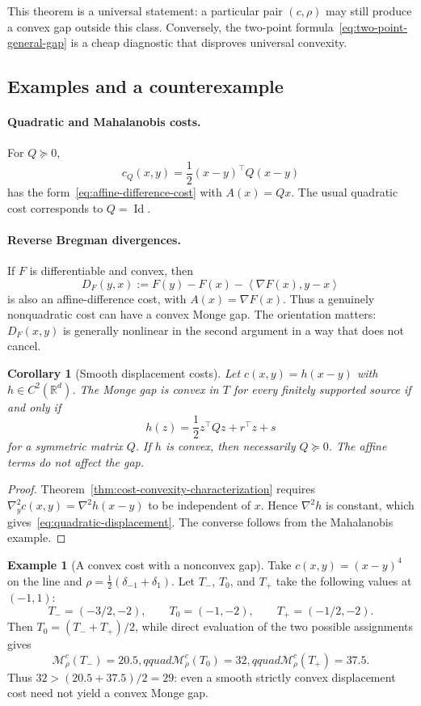 \documentclass[11pt,a4paper]{article}
\newtheorem{corollary}[theorem]{Corollary}
\theoremstyle{definition}
\newtheorem{example}[theorem]{Example}
\theoremstyle{remark}
\newcommand{\R}{\mathbb R}
\newcommand{\Mcal}{\mathcal M}
\newcommand{\Id}{\operatorname{Id}}
\newcommand{\ip}[2]{\left\langle #1,#2\right\rangle}
\begin{document}
This theorem is a universal statement: a particular pair $(c,\rho)$ may
still produce a convex gap outside this class. Conversely, the two-point
formula~\eqref{eq:two-point-general-gap} is a cheap diagnostic that disproves
universal convexity.

\subsection{Examples and a counterexample}

\paragraph{Quadratic and Mahalanobis costs.}
For $Q\succeq0$,
\[
  c_Q(x,y)=\frac12(x-y)^\top Q(x-y)
\]
has the form~\eqref{eq:affine-difference-cost} with $A(x)=Qx$. The usual
quadratic cost corresponds to $Q=\Id$.

\paragraph{Reverse Bregman divergences.}
If $F$ is differentiable and convex, then
\[
  D_F(y,x):=F(y)-F(x)-\ip{\nabla F(x)}{y-x}
\]
is also an affine-difference cost, with $A(x)=\nabla F(x)$. Thus a genuinely
nonquadratic cost can have a convex Monge gap. The orientation matters:
$D_F(x,y)$ is generally nonlinear in the second argument in a way that does
not cancel.

\begin{corollary}[Smooth displacement costs]\label{cor:displacement-classification}
Let $c(x,y)=h(x-y)$ with $h\in C^2(\R^d)$. The Monge gap is convex in $T$ for
every finitely supported source if and only if
\begin{equation}\label{eq:quadratic-displacement}
  h(z)=\frac12z^\top Qz+r^\top z+s
\end{equation}
for a symmetric matrix $Q$. If $h$ is convex, then necessarily $Q\succeq0$.
The affine terms do not affect the gap.
\end{corollary}

\begin{proof}
Theorem~\ref{thm:cost-convexity-characterization} requires
$\nabla_y^2c(x,y)=\nabla^2h(x-y)$ to be independent of $x$. Hence
$\nabla^2h$ is constant, which gives~\eqref{eq:quadratic-displacement}.
The converse follows from the Mahalanobis example.
\end{proof}

\begin{example}[A convex cost with a nonconvex gap]\label{ex:quartic-counterexample}
Take $c(x,y)=(x-y)^4$ on the line and
$\rho=\tfrac12(\delta_{-1}+\delta_1)$. Let $T_-$, $T_0$, and $T_+$ take the
following values at $(-1,1)$:
\[
  T_-=(-3/2,-2),\qquad T_0=(-1,-2),\qquad T_+=(-1/2,-2).
\]
Then $T_0=(T_-+T_+)/2$, while direct evaluation of the two possible
assignments gives
\[
  \Mcal_\rho^c(T_-)=20.5,qquad
  \Mcal_\rho^c(T_0)=32,qquad
  \Mcal_\rho^c(T_+)=37.5.
\]
Thus $32>(20.5+37.5)/2=29$: even a smooth strictly convex displacement cost
need not yield a convex Monge gap.
\end{example}
\end{document}
